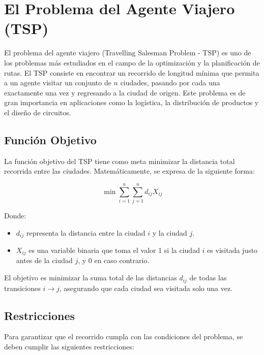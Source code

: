 \documentclass[12pt,titlepage,twoside,openright]{book}
\begin{document}
\section{El Problema del Agente Viajero (TSP)}
El problema del agente viajero (Travelling Salesman Problem - TSP) es uno de los problemas más estudiados en el campo de la optimización y la planificación de rutas. El TSP consiste en encontrar un recorrido de longitud mínima que permita a un agente visitar un conjunto de $n$ ciudades, pasando por cada una exactamente una vez y regresando a la ciudad de origen. Este problema es de gran importancia en aplicaciones como la logística, la distribución de productos y el diseño de circuitos.


\subsection{Función Objetivo}

La función objetivo del TSP tiene como meta minimizar la distancia total recorrida entre las ciudades. Matemáticamente, se expresa de la siguiente forma:

\[
	\min \sum_{i=1}^{n} \sum_{j=1}^{n} d_{ij} X_{ij}
\]

Donde:
\begin{itemize}
	\item $d_{ij}$ representa la distancia entre la ciudad $i$ y la ciudad $j$.
	\item $X_{ij}$ es una variable binaria que toma el valor 1 si la ciudad $i$ es visitada justo antes de la ciudad $j$, y 0 en caso contrario.
\end{itemize}

El objetivo es minimizar la suma total de las distancias $d_{ij}$ de todas las transiciones $i \to j$, asegurando que cada ciudad sea visitada solo una vez.

\subsection{Restricciones}

Para garantizar que el recorrido cumpla con las condiciones del problema, se deben cumplir las siguientes restricciones:
\end{document}
